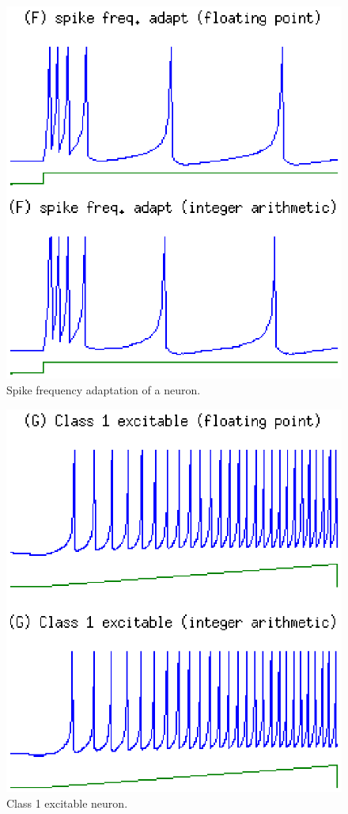 \documentclass[journal]{./sty/IEEEtran}
\begin{document}
\begin{figure}
\centering
\includegraphics[scale=0.6]{imgs/izh_spike_freq_adapt}
\caption{Spike frequency adaptation of a neuron.}
\end{figure}

\begin{figure}
\centering
\includegraphics[scale=0.6]{imgs/izh_class_1_excitable}
\caption{Class 1 excitable neuron.}
\end{figure}
\end{document}
